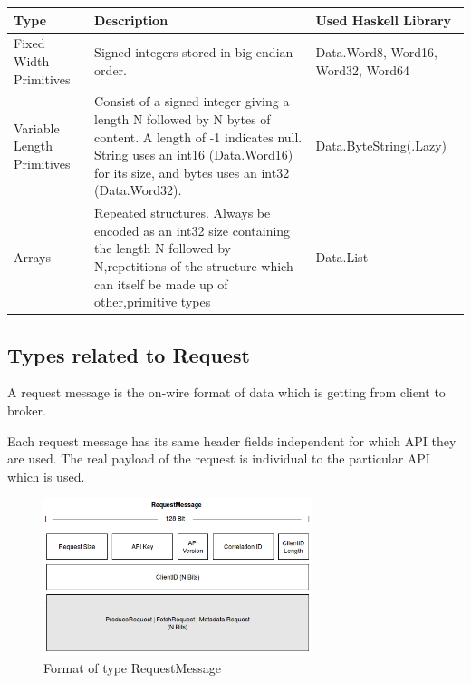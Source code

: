 \begin{table}[H]
    \begin{tabular}{| p{3cm}| p{7cm} | p{5cm} |}
\hline
\textbf{Type} & \textbf{Description} & \textbf{Used Haskell Library} \\ \hline
Fixed Width Primitives     & Signed integers stored in big endian order.
& Data.Word8, Word16, Word32, Word64 \\ \hline
Variable Length Primitives & Consist of a signed integer giving a length N
followed by N bytes of content. A length of -1 indicates null. String uses an
int16 (Data.Word16) for its size, and bytes uses an int32 (Data.Word32).    &
Data.ByteString(.Lazy) \\ \hline
Arrays                     & Repeated structures. Always be encoded as an int32
size containing the length N followed by N,repetitions of the structure which
can itself be made up of other,primitive types & Data.List                          \\ \hline
\end{tabular}
\end{table}

\subsection{Types related to Request}
A request message is the on-wire format of data which is getting from client to
broker.

Each request message has its same header fields independent for which API they are used. 
The real payload of the request is individual to the particular API which is
used. 

\begin{figure}[H]
    \centering
    \includegraphics[width=0.7\textwidth]{images/impl-prot-types-requestMessage.png}
    \caption{Format of type RequestMessage}
    \label{fig:impl-prot-types-requestMessage}
\end{figure}

